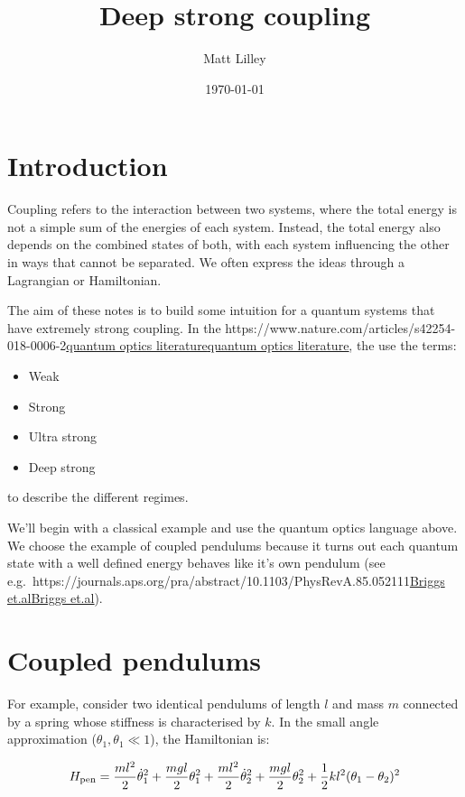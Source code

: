 \documentclass[
]{article}
\title{Deep strong coupling}
\author{Matt Lilley}
\date{\today}  %
\let\oldhref\href
\renewcommand{\href}[2]{\ifx#1\urlprefix\oldhref{#1}{#2}\else\uline{\oldhref{#1}{#2}}\fi}
\renewcommand{\[}{\begin{equation}}
\renewcommand{\]}{\end{equation}}
\providecommand{\tightlist}{%
  \setlength{\itemsep}{0pt}\setlength{\parskip}{0pt}}
\begin{document}
\maketitle

\section{Introduction}\label{introduction}

Coupling refers to the interaction between two systems, where the total
energy is not a simple sum of the energies of each system. Instead, the
total energy also depends on the combined states of both, with each
system influencing the other in ways that cannot be separated. We often
express the ideas through a Lagrangian or Hamiltonian.

The aim of these notes is to build some intuition for a quantum systems
that have extremely strong coupling. In the
\href{https://www.nature.com/articles/s42254-018-0006-2}{quantum optics
literature}, the use the terms:

\begin{itemize}
\tightlist
\item
  Weak
\item
  Strong
\item
  Ultra strong
\item
  Deep strong
\end{itemize}

to describe the different regimes.

We'll begin with a classical example and use the quantum optics language
above. We choose the example of coupled pendulums because it turns out
each quantum state with a well defined energy behaves like it's own
pendulum (see
e.g.~\href{https://journals.aps.org/pra/abstract/10.1103/PhysRevA.85.052111}{Briggs
et.al}).

\section{Coupled pendulums}\label{coupled-pendulums}

For example, consider two identical pendulums of length \(l\) and mass
\(m\) connected by a spring whose stiffness is characterised by \(k\).
In the small angle approximation (\(\theta_1, \theta_1 \ll 1\)), the
Hamiltonian is:

\[
H_{\rm pen} = \frac{m l^2}{2} \dot{\theta}_1^2 + \frac{m g l}{2} \theta_1^2 + \frac{m l^2}{2} \dot{\theta}_2^2 + \frac{m g l}{2} \theta_2^2 + \frac{1}{2} k l^2(\theta_1 - \theta_2)^2
\]
\end{document}
